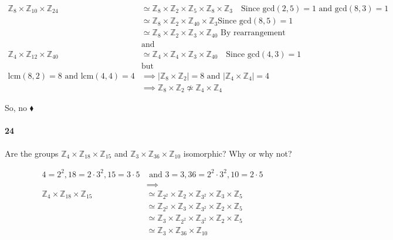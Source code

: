 \documentclass{article}
\newcommand\Z{\mathbb{Z}}
\begin{document}
\begin{align*}
\Z_8\times \Z_{10} \times \Z_{24} &\simeq \Z_8\times \Z_2\times \Z_{5}
                                    \times \Z_{8}\times\Z_{3}\quad \text{
                                    Since gcd$(2,5)=1$ and gcd$(8,3)=1$}\\
 &\simeq \Z_8\times \Z_2\times \Z_{40}\times\Z_{3} \text{
   Since gcd$(8,5)=1$}\\
   &\simeq \Z_8\times \Z_2 \times\Z_{3}\times \Z_{40} \text{ By
     rearrangement}\\
                                  &\text{and}\\
\Z_4\times \Z_{12} \times \Z_{40} &\simeq \Z_4\times \Z_4\times \Z_{3}
                                    \times \Z_{40}\quad \text{
                                    Since gcd$(4,3)=1$}\\
  &\text{but}\\
\text{lcm}(8,2)=8 \text{ and } \text{lcm}(4,4)=4 &\implies |\Z_8\times
\Z_2|=8 \text{ and } |\Z_4\times \Z_4|=4 \\ &\implies
                                              \Z_8\times \Z_2 \not\simeq \Z_4\times\Z_4
\end{align*}

So, no $\blacklozenge$

\paragraph{24} Are the groups $\Z_4\times \Z_{18} \times \Z_{15}$ and
$\Z_3\times \Z_{36}\times \Z_{10}$ isomorphic? Why or why not?

\begin{align*}
  4=2^2,18=2\cdot 3^2, 15 = 3\cdot 5&\text{ and }3 = 3, 36 = 2^2\cdot3^2,10
                                      = 2\cdot 5 \\ &\implies \\
  \Z_4\times \Z_{18} \times \Z_{15} &\simeq  \Z_{2^2}\times \Z_{2}
                                      \times \Z_{3^2} \times \Z_{3}\times \Z_{5}\\
                                      &\simeq  \Z_{2^2}\times \Z_{3}
                                        \times \Z_{3^2} \times \Z_{2}\times \Z_{5} \\
  &\simeq  \Z_{3}\times \Z_{2^2}
    \times \Z_{3^2} \times \Z_{2}\times \Z_{5} \\
                                    &\simeq \Z_3\times \Z_{36}\times \Z_{10}\\
\end{align*}
\end{document}
